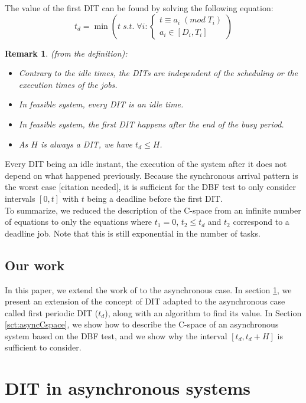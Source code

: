 \documentclass[times, 10pt,twocolumn, a4paper]{article}
\newtheorem{remark}{Remark}
\begin{document}
The value of the first DIT can be found by solving the following equation:
\[
  t_d = \min \left( t \; s.t. \; \forall i:
  \left\{
  \begin{array}{c}
    t \equiv a_i \; (mod \; T_i) \\
    a_i \in [D_i, T_i]
  \end{array}
  \right.
  \right)
\]

\begin{remark} (from the definition):
 \begin{itemize}
  \item Contrary to the idle times, the DITs are independent of the scheduling or the execution times of the jobs.
  \item In feasible system, every DIT is an idle time.
  \item In feasible system, the first DIT happens after the end of the busy period.
  \item As $H$ is always a DIT, we have $t_d \leq H$.
 \end{itemize}
\end{remark}

Every DIT being an idle instant, the execution of the system after it does not depend on what happened previously. Because the synchronous arrival pattern is the worst case [citation needed], it is sufficient for the DBF test to only consider intervals $[0, t]$ with $t$ being a deadline before the first DIT.\\

To summarize, we reduced the description of the C-space from an infinite number of equations to only the equations where $t_1 = 0$, $t_2 \leq t_d$ and $t_2$ correspond to a deadline job. Note that this is still exponential in the number of tasks.

  \subsection{Our work}

  In this paper, we extend the work of \cite{george2009characterization} to the asynchronous case. In section \ref{sct:asyncDIT}, we present an extension of the concept of DIT adapted to the asynchronous case called first periodic DIT ($t_d$), along with an algorithm to find its value. In Section \ref{sct:asyncCspace}, we show how to describe the C-space of an asynchronous system based on the DBF test, and we show why the interval $[t_d, t_d + H]$ is sufficient to consider.

\section{DIT in asynchronous systems}
  \label{sct:asyncDIT}
\end{document}
